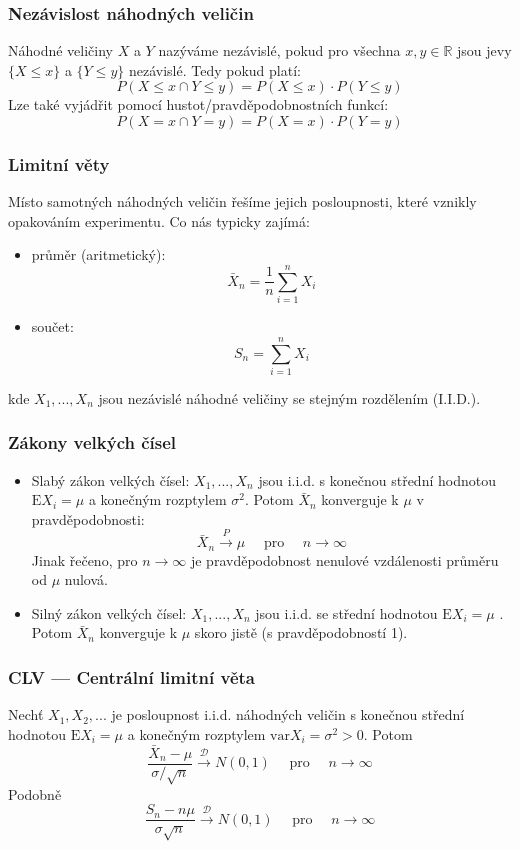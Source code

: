 \subsubsection*{Nezávislost náhodných veličin}
Náhodné veličiny $X$ a $Y$ nazýváme nezávislé, pokud pro všechna $x, y \in \mathbb{R}$ jsou jevy $\{X \leq x\}$ a $\{Y \leq y\}$ nezávislé. Tedy pokud platí: $$P(X \leq x \cap Y \leq y) = P(X\leq x) \cdot P(Y \leq y) $$
Lze také vyjádřit pomocí hustot/pravděpodobnostních funkcí:
$$P(X = x \cap Y = y) = P(X = x) \cdot P(Y = y) $$

\subsubsection*{Limitní věty}
Místo samotných náhodných veličin řešíme jejich posloupnosti, které vznikly opakováním experimentu. Co nás typicky zajímá:
\begin{itemize}
	\item průměr (aritmetický): $$\bar{X}_n = \frac{1}{n}\sum_{i = 1}^n X_i$$
	\item součet: $$S_n = \sum_{i = 1}^n X_i $$
\end{itemize}
kde $X_1,...,X_n$ jsou nezávislé náhodné veličiny se stejným rozdělením (I.I.D.).

\subsubsection*{Zákony velkých čísel}
\begin{itemize}
	\item Slabý zákon velkých čísel: $X_1,...,X_n$ jsou i.i.d. s konečnou střední hodnotou $\text{E}X_i = \mu$ a konečným rozptylem $\sigma^2$. Potom $ \bar{X}_n$ konverguje k $\mu$ v pravděpodobnosti: $$\bar{X}_n \xrightarrow{P} \mu \quad \text{ pro } \quad n\to\infty $$
	Jinak řečeno, pro $n\to\infty$ je pravděpodobnost nenulové vzdálenosti průměru od $\mu$ nulová.
	
	\item Silný zákon velkých čísel: $X_1,...,X_n$ jsou i.i.d. se střední hodnotou $\text{E}X_i = \mu$ . Potom $\bar{X}_n$ konverguje k $\mu$ skoro jistě (s pravděpodobností 1).
\end{itemize}

\subsubsection*{CLV --- Centrální limitní věta}
Nechť $X_1,X_2,...$ je posloupnost i.i.d. náhodných veličin s konečnou střední hodnotou $\text{E}X_i = \mu$ a konečným rozptylem $\text{var}X_i = \sigma^2 > 0$. Potom $$\frac{\bar{X}_n - \mu}{\sigma / \sqrt{n}} \xrightarrow{\mathcal{D}} N(0,1) \quad \text{ pro } \quad n\to\infty$$
Podobně
$$\frac{S_n - n\mu}{\sigma \sqrt{n}} \xrightarrow{\mathcal{D}} N(0,1) \quad \text{ pro } \quad n\to\infty$$